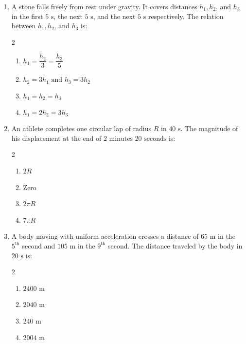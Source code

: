 \documentclass[11pt,a4paper]{article}
\begin{document}
\begin{enumerate}[label=\textbf{\textcolor{l2Amber}{Q\arabic*.}},leftmargin=24pt,itemsep=10pt,start=26]
  \item A stone falls freely from rest under gravity. It covers distances $h_1, h_2$, and $h_3$ in the first $5\text{ s}$, the next $5\text{ s}$, and the next $5\text{ s}$ respectively. The relation between $h_1, h_2$, and $h_3$ is:
  \begin{multicols}{2}
  \begin{enumerate}[label=\textbf{\textcolor{primaryDark}{(\Alph*)}},itemsep=2pt]
    \item $h_1 = \dfrac{h_2}{3} = \dfrac{h_3}{5}$
    \item $h_2 = 3h_1 \text{ and } h_3 = 3h_2$
    \item $h_1 = h_2 = h_3$
    \item $h_1 = 2h_2 = 3h_3$
  \end{enumerate}
  \end{multicols}

  \item An athlete completes one circular lap of radius $R$ in $40\text{ s}$. The magnitude of his displacement at the end of $2\text{ minutes } 20\text{ seconds}$ is:
  \begin{multicols}{2}
  \begin{enumerate}[label=\textbf{\textcolor{primaryDark}{(\Alph*)}},itemsep=2pt]
    \item $2R$
    \item Zero
    \item $2\pi R$
    \item $7\pi R$
  \end{enumerate}
  \end{multicols}

  \item A body moving with uniform acceleration crosses a distance of $65\text{ m}$ in the $5^{\text{th}}$ second and $105\text{ m}$ in the $9^{\text{th}}$ second. The distance traveled by the body in $20\text{ s}$ is:
  \begin{multicols}{2}
  \begin{enumerate}[label=\textbf{\textcolor{primaryDark}{(\Alph*)}},itemsep=2pt]
    \item $2400\text{ m}$
    \item $2040\text{ m}$
    \item $240\text{ m}$
    \item $2004\text{ m}$
  \end{enumerate}
  \end{multicols}


\end{enumerate}
\end{document}
